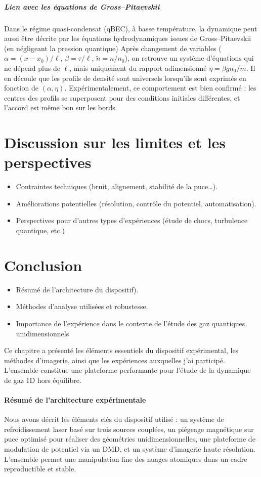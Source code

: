 \subparagraph{Lien avec les équations de Gross–Pitaevskii}
Dans le régime quasi-condensat (qBEC), à basse température, la dynamique peut aussi être décrite par les équations hydrodynamiques issues de Gross–Pitaevskii (en négligeant la pression quantique) 
Après changement de variables ($\alpha=(x-x_0)/\ell$, $\beta=\tau/\ell$, $\tilde n=n/n_0$), on retrouve un système d’équations qui ne dépend plus de $\ell$, mais uniquement du rapport adimensionné $\eta=\beta g n_0/m$.
Il en découle que les profils de densité sont universels lorsqu’ils sont exprimés en fonction de $(\alpha,\eta)$. Expérimentalement, ce comportement est bien confirmé : les centres des profils se superposent pour des conditions initiales différentes, et l’accord est même bon sur les bords.


\section{Discussion sur les limites et les perspectives}
\begin{itemize}
    \item Contraintes techniques (bruit, alignement, stabilité de la puce…).
    \item Améliorations potentielles (résolution, contrôle du potentiel, automatisation).
    \item Perspectives pour d’autres types d’expériences (étude de chocs, turbulence quantique, etc.)
\end{itemize}

\section*{Conclusion}
\begin{itemize}
    \item Résumé de l’architecture du dispositif).
    \item Méthodes d’analyse utilisées et robustesse.
    \item Importance de l’expérience dans le contexte de l’étude des gaz quantiques unidimensionnels
\end{itemize}
Ce chapitre a présenté les éléments essentiels du dispositif expérimental, les méthodes d’imagerie, ainsi que les expériences auxquelles j’ai participé. L’ensemble constitue une plateforme performante pour l’étude de la dynamique de gaz 1D hors équilibre.

\paragraph{Résumé de l’architecture expérimentale}  
Nous avons décrit les éléments clés du dispositif utilisé : un système de refroidissement laser basé sur trois sources couplées, un piégeage magnétique sur puce optimisé pour réaliser des géométries unidimensionnelles, une plateforme de modulation de potentiel via un DMD, et un système d’imagerie haute résolution. L’ensemble permet une manipulation fine des nuages atomiques dans un cadre reproductible et stable.

